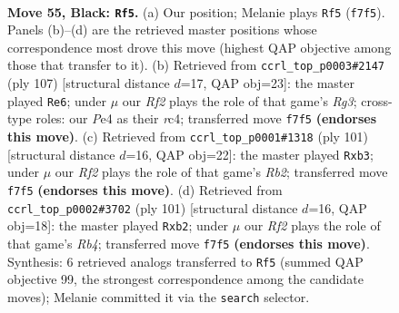 \documentclass[11pt]{article}
\begin{document}
\clearpage

\begin{figure}[p]\centering
\begin{subfigure}{0.46\textwidth}\centering
\resizebox{\linewidth}{!}{%
\newchessgame
\chessboard[
  setfen={8/5rpk/1P6/8/3ppP2/6K1/8/3q4 b - f3 0 55},
  showmover=false,
  pgfstyle=straightmove, color=movearrow, markmove={f7-f5}
]}
\caption{}
\end{subfigure}\hfill
\begin{subfigure}{0.46\textwidth}\centering
\resizebox{\linewidth}{!}{%
\newchessgame
\chessboard[
  setfen={8/8/1p4r1/1P2kp2/2R5/6P1/5K2/8 b - - 2 54},
  showmover=false,
  pgfstyle=straightmove, color=movearrow, markmove={g6-e6}
]}
\caption{}
\end{subfigure}
\\[4pt]
\begin{subfigure}{0.46\textwidth}\centering
\resizebox{\linewidth}{!}{%
\newchessgame
\chessboard[
  setfen={8/1r3pk1/8/p7/2P5/1P6/5P1K/R7 b - - 0 51},
  showmover=false,
  pgfstyle=straightmove, color=movearrow, markmove={b7-b3}
]}
\caption{}
\end{subfigure}\hfill
\begin{subfigure}{0.46\textwidth}\centering
\resizebox{\linewidth}{!}{%
\newchessgame
\chessboard[
  setfen={8/R7/8/pr3pk1/8/8/1P2P2P/4K3 b - - 1 51},
  showmover=false,
  pgfstyle=straightmove, color=movearrow, markmove={b5-b2}
]}
\caption{}
\end{subfigure}
\caption{\textbf{Move 55, Black: \texttt{Rf5}.} (a) Our position; Melanie plays \texttt{Rf5} (\texttt{f7f5}). Panels (b)--(d) are the retrieved master positions whose correspondence most drove this move (highest QAP objective among those that transfer to it). (b) Retrieved from \texttt{ccrl\_top\_p0003\#2147} (ply 107) [structural distance $d$=17, QAP obj=23]: the master played \texttt{Re6}; under $\mu$ our \emph{Rf2} plays the role of that game's \emph{Rg3}; cross-type roles: our \emph{P}e4 as their \emph{r}c4; transferred move \texttt{f7f5} \textbf{(endorses this move)}. (c) Retrieved from \texttt{ccrl\_top\_p0001\#1318} (ply 101) [structural distance $d$=16, QAP obj=22]: the master played \texttt{Rxb3}; under $\mu$ our \emph{Rf2} plays the role of that game's \emph{Rb2}; transferred move \texttt{f7f5} \textbf{(endorses this move)}. (d) Retrieved from \texttt{ccrl\_top\_p0002\#3702} (ply 101) [structural distance $d$=16, QAP obj=18]: the master played \texttt{Rxb2}; under $\mu$ our \emph{Rf2} plays the role of that game's \emph{Rb4}; transferred move \texttt{f7f5} \textbf{(endorses this move)}. Synthesis: 6 retrieved analogs transferred to \texttt{Rf5} (summed QAP objective 99, the strongest correspondence among the candidate moves); Melanie committed it via the \texttt{search} selector.}
\label{fig:thought-m109}
\end{figure}
\end{document}
